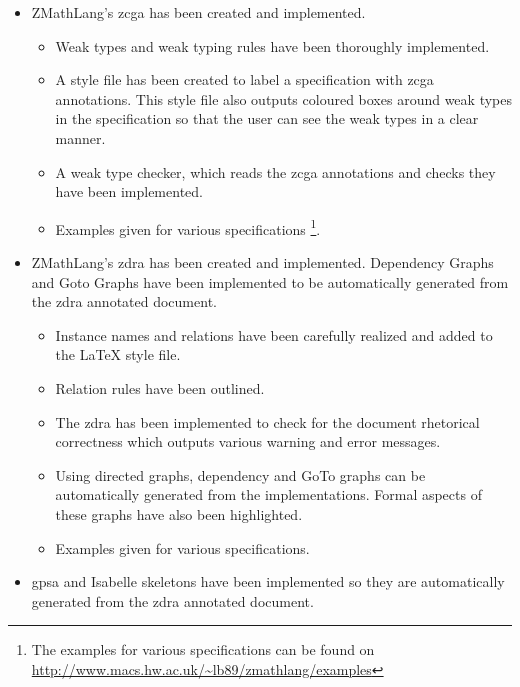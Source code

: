 \begin{itemize}
\item ZMathLang's \gls{zcga} has been created and implemented.

\begin{itemize}

\item Weak types and weak typing rules have been thoroughly implemented. 

\item A style file has been created to label a specification with \gls{zcga} annotations. This style file also outputs coloured boxes around weak types in the specification so that the user can see the weak types in a clear manner.

\item A weak type checker, which reads the \gls{zcga} annotations and checks they have been implemented.

\item Examples given for various specifications \footnote{The examples for various specifications can be found on \url{http://www.macs.hw.ac.uk/~lb89/zmathlang/examples}}.
\end{itemize}

\item ZMathLang's \gls{zdra} has been created and implemented. Dependency Graphs and Goto Graphs have been implemented to be automatically generated from the \gls{zdra} annotated document.

\begin{itemize}
\item Instance names and relations have been carefully realized and added to the \LaTeX{} style file.

\item Relation rules have been outlined.

\item The \gls{zdra} has been implemented to check for the document rhetorical correctness which outputs various warning and error messages.

\item Using directed graphs, dependency and GoTo graphs can be automatically generated from the implementations. Formal aspects of these graphs have also been highlighted.

\item Examples given for various specifications.
\end{itemize}

\item \gls{gpsa} and Isabelle skeletons have been implemented so they are automatically generated from the \gls{zdra} annotated document.


\end{itemize}
